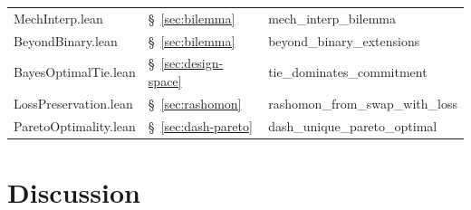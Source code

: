 \documentclass{jmlr}
\begin{document}
\begin{table}[t]
\begin{tabular}{@{}p{3.8cm}ll@{}}
MechInterp.lean & \S~\ref{sec:bilemma} & mech\_interp\_bilemma \\
BeyondBinary.lean & \S~\ref{sec:bilemma} & beyond\_binary\_extensions \\
BayesOptimalTie.lean & \S~\ref{sec:design-space} & tie\_dominates\_commitment \\
LossPreservation.lean & \S~\ref{sec:rashomon} & rashomon\_from\_swap\_with\_loss \\
ParetoOptimality.lean & \S~\ref{sec:dash-pareto} & dash\_unique\_pareto\_optimal \\
\bottomrule
\end{tabular}
\end{table}


\section{Discussion}
\label{sec:discussion}
\end{document}

